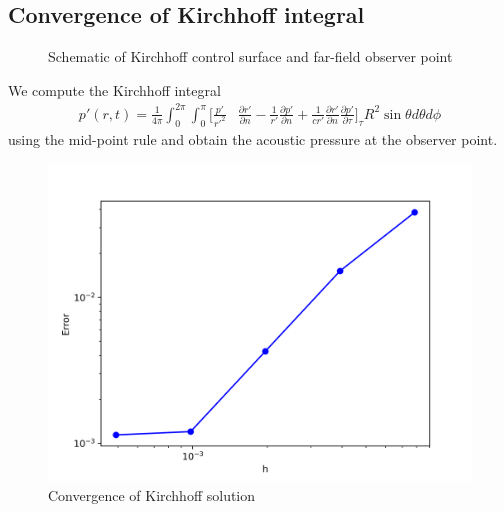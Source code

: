 \documentclass[a4paper]{article}
\begin{document}
\subsection*{Convergence of Kirchhoff integral}
\begin{figure}[!h]
    \centering
    \caption{Schematic of Kirchhoff control surface and far-field observer point}
\end{figure}
We compute the Kirchhoff integral
\begin{equation}
    \begin{split}
        p'(r,t) =  \frac{1}{4\pi}\int_{0}^{2\pi}\int_{0}^{\pi}\Big[  \frac{p'}{r'^{2}}&\frac{\partial r'}{\partial n} - \frac{1}{r'}\frac{\partial p'}{\partial n} + \frac{1}{c r'}\frac{\partial r'}{\partial n}\frac{\partial p'}{\partial \tau} \Big]_{\tau} R^2\sin\theta d\theta d \phi  
    \end{split} 
\end{equation}
using the mid-point rule and obtain the acoustic pressure at the observer point.
\begin{figure}[h!]
    \centering
    \includegraphics[scale=0.7]{images/Convergence.png}
    \caption{Convergence of Kirchhoff solution}
\end{figure}
\end{document}
